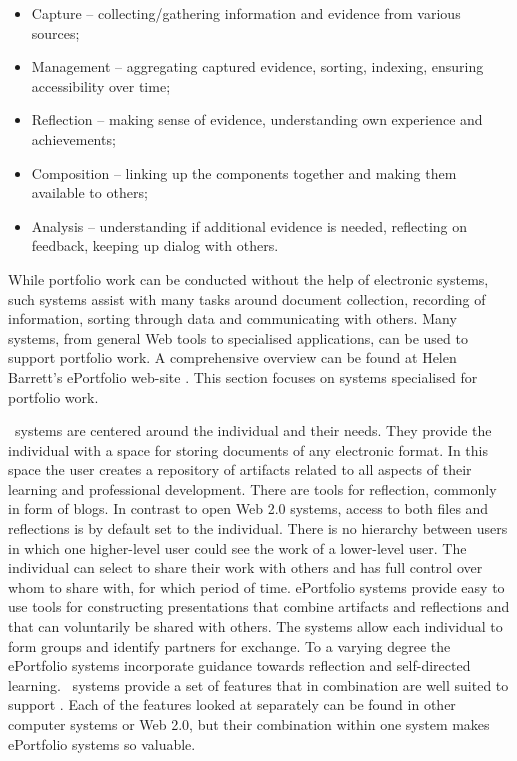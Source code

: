 \begin{itemize}
  \item Capture -- collecting/gathering information and evidence from various
  sources;
  \item Management -- aggregating captured evidence, sorting, indexing, ensuring
  accessibility over time;
  \item Reflection -- making sense of evidence, understanding own experience and
  achievements;
  \item Composition -- linking up the components together and making them
  available to others;
  \item Analysis -- understanding if additional evidence is needed, reflecting
  on feedback, keeping up dialog with others.
\end{itemize}

While portfolio work can be conducted without the help of electronic systems,
such systems assist with many tasks around document collection, recording of
information, sorting through data and communicating with others. Many systems,
from general Web tools to specialised applications, can be used to support
portfolio work. A comprehensive overview can be found at Helen Barrett's
ePortfolio web-site \citep{Barrett2008}. This section focuses on systems
specialised for portfolio work.

\ep~systems are centered around the individual and their needs. They provide the
individual with a space for storing documents of any electronic format. In this
space the user creates a repository of artifacts related to all aspects of their
learning and professional development. There are tools for reflection, commonly
in form of blogs. In contrast to open Web 2.0 systems, access to both files and
reflections is by default set to the individual. There is no hierarchy between
users in which one higher-level user could see the work of a lower-level user.
The individual can select to share their work with others and has full control
over whom to share with, for which period of time. ePortfolio systems provide
easy to use tools for constructing presentations that combine artifacts and
reflections and that can voluntarily be shared with others. The systems allow
each individual to form groups and identify partners for exchange. To a varying
degree the ePortfolio systems incorporate guidance towards reflection and
self-directed learning. \ep~systems provide a set of features that in
combination are well suited to support \LLLsn. Each of the features looked at
separately can be found in other computer systems or Web 2.0, but their
combination within one system makes ePortfolio systems so valuable.

